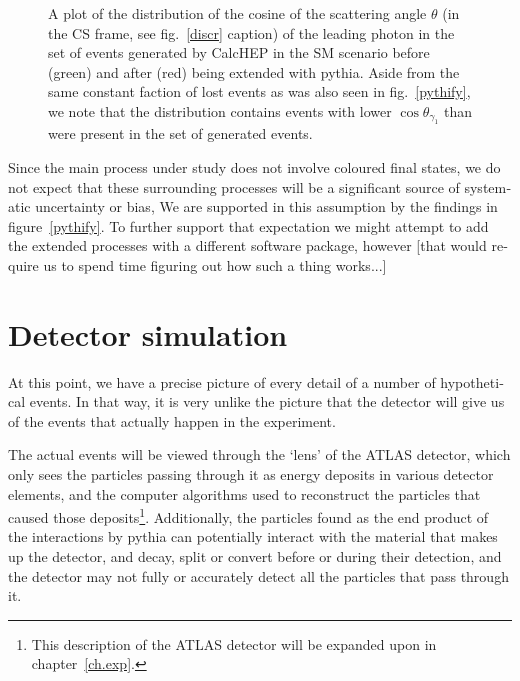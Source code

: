 \begin{english}
\begin{figure}[hbt]
\begin{minipage}[b]{.65\textwidth}
\begin{infilsf} \tiny \makebox[0pt][l]{
\hspace{-1em}
}\end{infilsf}
\end{minipage}
\hfill\begin{minipage}[b]{.3\textwidth}
\caption{A plot of the distribution of the cosine of the scattering angle $\theta$ (in the CS frame, see fig.~\ref{discr} caption) of the leading photon in the set of events generated by CalcHEP in the SM scenario before (green) and after (red) being extended with pythia. Aside from the same constant faction of lost events as was also seen in fig.~\ref{pythify}, we note that the distribution contains events with lower $\cos\theta_{\gamma_1}$ than were present in the set of generated events.
\label{pythicos}}
\end{minipage}
\end{figure}

Since the main process under study does not involve coloured final states, we do not expect that these surrounding processes will be a significant source of systematic uncertainty or bias, We are supported in this assumption by the findings in figure~\ref{pythify}. To further support that expectation we might attempt to add the extended processes with a different software package, however [that would require us to spend time figuring out how such a thing works...]

\section{Detector simulation}
At this point, we have a precise picture of every detail of a number of hypothetical events. In that way, it is very unlike the picture that the detector will give us of the events that actually happen in the experiment.

The actual events will be viewed through the `lens' of the ATLAS detector, which only sees the particles passing through it as energy deposits in various detector elements, and the computer algorithms used to reconstruct the particles that caused those deposits\footnote{This description of the ATLAS detector will be expanded upon in chapter~\ref{ch.exp}.}. Additionally, the particles found as the end product of the interactions by pythia can potentially interact with the material that makes up the detector, and decay, split or convert before or during their detection, and the detector may not fully or accurately detect all the particles that pass through it.


\end{english}

